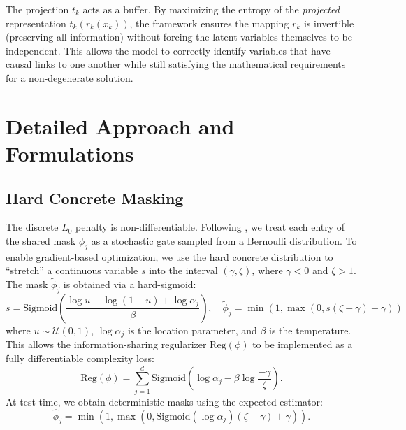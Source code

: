 \documentclass[a4paper,12pt]{article}
\begin{document}
The projection $t_k$ acts as a buffer. By maximizing the entropy of the \textit{projected} representation $t_k(r_k(x_k))$, the framework ensures the mapping $r_k$ is invertible (preserving all information) without forcing the latent variables themselves to be independent. This allows the model to correctly identify variables that have causal links to one another while still satisfying the mathematical requirements for a non-degenerate solution.

\section{Detailed Approach and Formulations} \label{app:approach_details}

\subsection{Hard Concrete Masking}
The discrete $L_0$ penalty is non-differentiable. Following \cite{louizos2018learningsparseneuralnetworks}, we treat each entry of the shared mask $\phi_j$ as a stochastic gate sampled from a Bernoulli distribution. To enable gradient-based optimization, we use the hard concrete distribution to ``stretch'' a continuous variable $s$ into the interval $(\gamma, \zeta)$, where $\gamma < 0$ and $\zeta > 1$. The mask $\tilde{\phi}_j$ is obtained via a hard-sigmoid:
\begin{equation}
  s = \text{Sigmoid} \left( \frac{\log u - \log(1-u) + \log \alpha_j}{\beta} \right), \quad \tilde{\phi}_j = \min(1, \max(0, s(\zeta - \gamma) + \gamma))
\end{equation}
where $u \sim \mathcal{U}(0,1)$, $\log \alpha_j$ is the location parameter, and $\beta$ is the temperature. This allows the information-sharing regularizer $\text{Reg}(\phi)$ to be implemented as a fully differentiable complexity loss:
\begin{equation}
  \text{Reg}(\phi) = \sum_{j=1}^d \text{Sigmoid}\left(\log \alpha_j - \beta \log \frac{-\gamma}{\zeta}\right).
\end{equation}
At test time, we obtain deterministic masks using the expected estimator:
\begin{equation}
  \hat{\phi}_j = \min(1, \max(0, \text{Sigmoid}(\log \alpha_j)(\zeta - \gamma) + \gamma)).
\end{equation}
\end{document}
